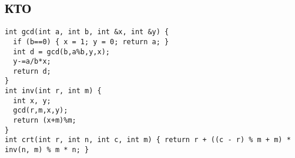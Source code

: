 \subsection{КТО}
\begin{lstlisting}
int gcd(int a, int b, int &x, int &y) {
  if (b==0) { x = 1; y = 0; return a; }
  int d = gcd(b,a%b,y,x);
  y-=a/b*x;
  return d;
}
int inv(int r, int m) {
  int x, y;
  gcd(r,m,x,y);
  return (x+m)%m;
}
int crt(int r, int n, int c, int m) { return r + ((c - r) % m + m) * inv(n, m) % m * n; }
\end{lstlisting}
